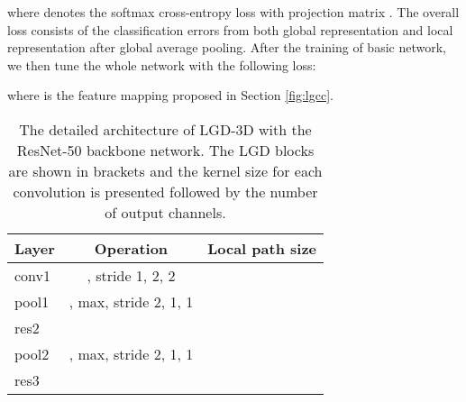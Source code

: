 \documentclass[10pt,twocolumn,letterpaper]{article}
\begin{document}
where  denotes the softmax cross-entropy loss with projection matrix . The overall loss consists of the classification errors from both global representation and local representation after global average pooling. After the training of basic network, we then tune the whole network with the following loss:

where  is the feature mapping proposed in Section \ref{fig:lgcc}.

\begin{table}
\centering
\scriptsize
\caption{\small The detailed architecture of LGD-3D with the ResNet-50 backbone network. The LGD blocks are shown in brackets and the kernel size for each convolution is presented followed by the number of output channels.}
\vspace{0.1cm}
\begin{tabular}{l|c|c} \hline
\begin{minipage}{0.88cm}\vspace{0.05cm} \textbf{Layer} \vspace{0.05cm}\end{minipage}     & \textbf{Operation} & \textbf{Local path size} \\ \hline
\begin{minipage}{0.88cm}\vspace{0.22cm} conv1 \vspace{0.22cm}\end{minipage}    & , stride 1, 2, 2 & \\ \hline
\begin{minipage}{0.88cm}\vspace{0.10cm} pool1 \vspace{0.10cm}\end{minipage}    & , max, stride 2, 1, 1 &  \\ \hline
\begin{minipage}{0.88cm}\vspace{0.55cm} res2 \vspace{0.55cm}\end{minipage}    &  &  \\ \hline
\begin{minipage}{0.88cm}\vspace{0.10cm} pool2 \vspace{0.10cm}\end{minipage}    & , max, stride 2, 1, 1 &  \\ \hline
\begin{minipage}{0.88cm}\vspace{0.55cm} res3 \vspace{0.55cm}\end{minipage}    &  &  \\ \hline

\end{tabular}
\end{table}
\end{document}
